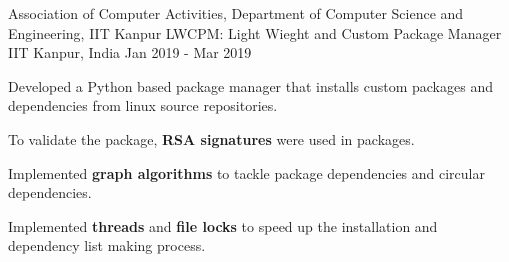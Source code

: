 \begin{cventries}
\cventry
    {Association of Computer Activities, Department of Computer Science and Engineering, IIT Kanpur} %
    {LWCPM: Light Wieght and Custom Package Manager} %
    {IIT Kanpur, India} %
    {Jan 2019 - Mar 2019} %
    {
      \begin{cvitems} %
        \item {Developed a Python based package manager that installs custom packages and dependencies from linux source repositories.}
        \item {To validate the package, \textbf{RSA signatures} were used in packages.}
        \item {Implemented \textbf{graph algorithms} to tackle package dependencies and circular dependencies.}
        \item {Implemented \textbf{threads} and \textbf{file locks} to speed up the installation and dependency list making process.}
      \end{cvitems}
    }

\end{cventries}
